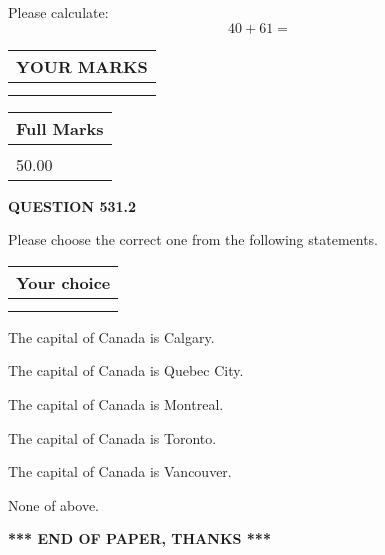 \documentclass[12pt]{article}
\begin{document}
  
 
Please calculate:
\begin{equation}
40 +  %
61 = \nonumber
\end{equation}
 

 

 
  
\vspace{0.2in}
  
\noindent\begin{tabular}{|l|}
\hline
 YOUR MARKS  \\
\hline
 \\ 
 \\ 
\hline
\end{tabular}
\hspace{0.05in} \begin{tabular}{|l|}
\hline
 Full Marks  \\
\hline
 \\ 
50.00 \\
\hline
\end{tabular}
{\textbf{\Large{QUESTION
531.2 
}}}
  
  
Please choose the correct one from the following statements.
  
  
\noindent\hspace{3.0in} \begin{tabular}{|l|}
\hline
Your choice \\
\hline
 \\ 
 \\ 
\hline
\end{tabular}
  
  
 
 
The capital of Canada is Calgary.
 
 
The capital of Canada is Quebec City.
 
 
The capital of Canada is Montreal.
 
 
The capital of Canada is Toronto.
 
 
The capital of Canada is Vancouver.
 
 
 None of above.
 
 
   
   
 \vspace{0.2in}
 
   
   
   
   
\vspace{1.0in} 
{\textbf{\large{ *** END OF PAPER, THANKS *** }}} 
   
\end{document}

